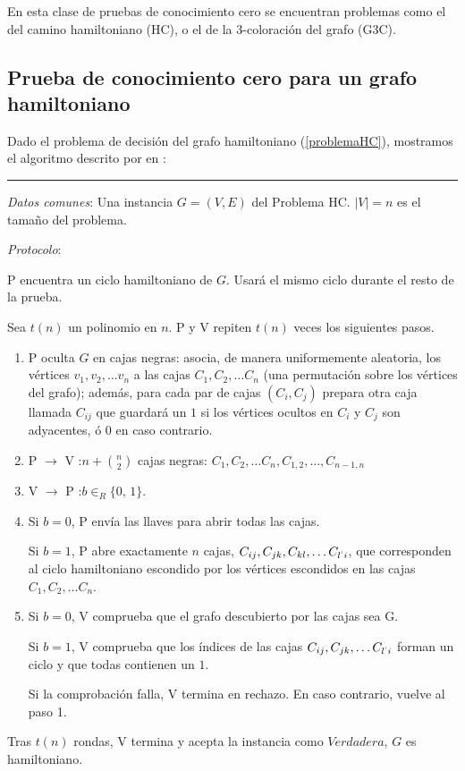 En esta clase de pruebas de conocimiento cero se encuentran problemas como el del camino hamiltoniano (HC), o el de la 3-coloración del grafo (G3C).


\subsection{Prueba de conocimiento cero para un grafo hamiltoniano}

Dado el problema de decisión del grafo hamiltoniano (\autoref{problemaHC}), mostramos el algoritmo descrito por \citeauthor{blum} en \citep{blum}:


\rule{\textwidth}{1pt}
\begin{algorithm}\label{HCinteractive:alg}
	
	\hfil
	
	\textit{Datos comunes}: Una instancia $G=(V,E)$ del Problema HC. $\mid V \mid = n$ es el tamaño del problema.
	
	\textit{Protocolo}: 
	
	P encuentra un ciclo hamiltoniano de $G$. Usará el mismo ciclo durante el resto de la prueba.
	
	Sea $t(n)$ un polinomio en $n$. P y V repiten $t(n)$ veces los siguientes pasos.
	
	\begin{enumerate}
		
		\item P oculta $G$ en cajas negras: asocia, de manera uniformemente aleatoria, los vértices $v_1, v_2, \dots v_n$ a las cajas $C_1, C_2, \dots C_n$ (una permutación sobre los vértices del grafo); además, para cada par de cajas $(C_i,C_j)$ prepara otra caja llamada $C_{ij}$ que guardará un $1$ si los vértices ocultos en $C_i$ y $C_j$ son adyacentes, ó $0$ en caso contrario.
		
		\item P $\rightarrow$ V :\quad $n + \binom{n}{2}$ cajas negras: $C_1, C_2, \dots C_n, C_{1,2},\dots, C_{n-1,n}$
		
		\item V $\rightarrow$ P :\quad $b \in_R \{0,\,1\}$.
		
		\item Si $b=0$, P envía las llaves para abrir todas las cajas.
		
		Si $b=1$, P abre exactamente $n$ cajas, $C_{ij}, C_{jk}, C_{kl}, \dots C_{l^`i}$, que corresponden al ciclo hamiltoniano escondido por los vértices escondidos en las cajas $C_1, C_2, \dots C_n$.
		
		\item Si $b=0$, V comprueba que el grafo descubierto por las cajas sea G.
		
		Si $b=1$, V comprueba que los índices de las cajas  $C_{ij}, C_{jk}, \dots C_{l^`i}$ forman un ciclo y que todas contienen un $1$.
		
		Si la comprobación falla, V termina en rechazo. En caso contrario, vuelve al paso 1.
		
		
	\end{enumerate}
	
	Tras $t(n)$ rondas, V termina y acepta la instancia como $Verdadera$, $G$ es hamiltoniano.
	
\end{algorithm}
